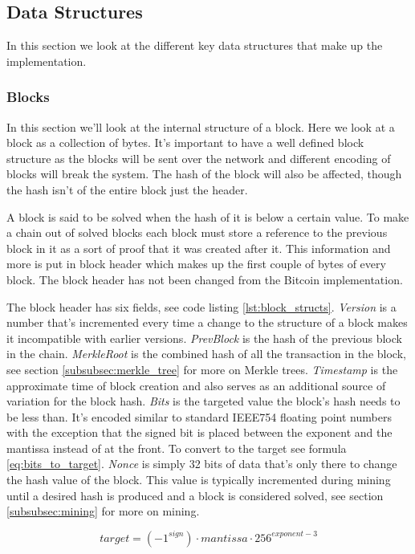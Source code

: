 \documentclass[11pt]{article}
\begin{document}
\subsection{Data Structures}
In this section we look at the different key data structures that make up the implementation. 

\subsubsection{Blocks}
In this section we'll look at the internal structure of a block. Here we look at a block as a collection of bytes. It's important to have a well defined block structure as the blocks will be sent over the network and different encoding of blocks will break the system. The hash of the block will also be affected, though the hash isn't of the entire block just the header.

A block is said to be solved when the hash of it is below a certain value. To make a chain out of solved blocks each block must store a reference to the previous block in it as a sort of proof that it was created after it. This information and more is put in block header which makes up the first couple of bytes of every block. The block header has not been changed from the Bitcoin implementation. 

The block header has six fields, see code listing \ref{lst:block_structs}. \emph{Version} is a number that's incremented every time a change to the structure of a block makes it incompatible with earlier versions. \emph{PrevBlock} is the hash of the previous block in the chain. \emph{MerkleRoot} is the combined hash of all the transaction in the block, see section \ref{subsubsec:merkle_tree} for more on Merkle trees. \emph{Timestamp} is the approximate time of block creation and also serves as an additional source of variation for the block hash. \emph{Bits} is the targeted value the block's hash needs to be less than. It's encoded similar to standard IEEE754 floating point numbers with the exception that the signed bit is placed between the exponent and the mantissa instead of at the front. To convert to the target see formula \ref{eq:bits_to_target}. \emph{Nonce} is simply 32 bits of data that's only there to change the hash value of the block. This value is typically incremented during mining until a desired hash is produced and a block is considered solved, see section \ref{subsubsec:mining} for more on mining.

\begin{equation}\label{eq:bits_to_target}
\mathit{target} = (-1^{\mathit{sign}}) \cdot \mathit{mantissa} \cdot 256^{\mathit{exponent-3}}
\end{equation}
\end{document}
